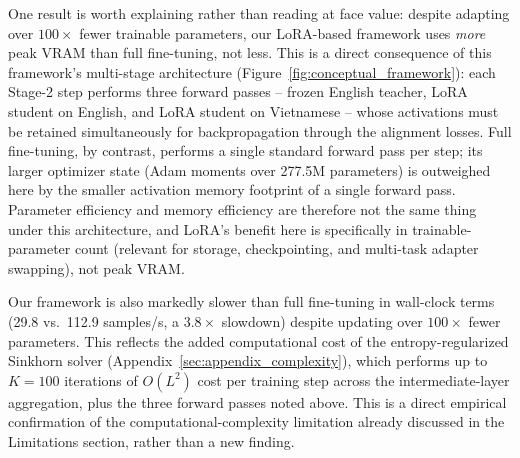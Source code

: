 \documentclass[11pt]{article}
\begin{document}
\begin{table}[t]
\centering
\small
{}
\caption{Computational cost profile (mean $\pm$ SD over 20 measured steps, batch size 128, sequence length 256, single A100-80GB GPU) for all four external baselines and our framework, alongside Full Fine-Tuning, all measured under the identical protocol.}
\label{tab:compute_cost}
\end{table}

One result is worth explaining rather than reading at face value: despite adapting over $100\times$ fewer trainable parameters, our LoRA-based framework uses \emph{more} peak VRAM than full fine-tuning, not less. This is a direct consequence of this framework's multi-stage architecture (Figure~\ref{fig:conceptual_framework}): each Stage-2 step performs three forward passes -- frozen English teacher, LoRA student on English, and LoRA student on Vietnamese -- whose activations must be retained simultaneously for backpropagation through the alignment losses. Full fine-tuning, by contrast, performs a single standard forward pass per step; its larger optimizer state (Adam moments over 277.5M parameters) is outweighed here by the smaller activation memory footprint of a single forward pass. Parameter efficiency and memory efficiency are therefore not the same thing under this architecture, and LoRA's benefit here is specifically in trainable-parameter count (relevant for storage, checkpointing, and multi-task adapter swapping), not peak VRAM.

Our framework is also markedly slower than full fine-tuning in wall-clock terms (29.8 vs.\ 112.9 samples/s, a $3.8\times$ slowdown) despite updating over $100\times$ fewer parameters. This reflects the added computational cost of the entropy-regularized Sinkhorn solver (Appendix~\ref{sec:appendix_complexity}), which performs up to $K=100$ iterations of $O(L^2)$ cost per training step across the intermediate-layer aggregation, plus the three forward passes noted above. This is a direct empirical confirmation of the computational-complexity limitation already discussed in the Limitations section, rather than a new finding.
\end{document}
